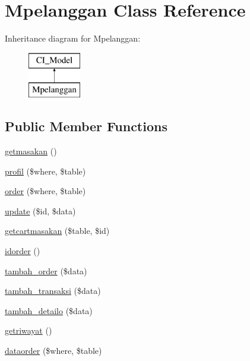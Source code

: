 \hypertarget{class_mpelanggan}{}\section{Mpelanggan Class Reference}
\label{class_mpelanggan}
Inheritance diagram for Mpelanggan\+:\begin{figure}[H]
\begin{center}
\leavevmode
\includegraphics[height=2.000000cm]{class_mpelanggan}
\end{center}
\end{figure}
\subsection*{Public Member Functions}
\begin{DoxyCompactItemize}
\item 
\mbox{\hyperlink{class_mpelanggan_af6cb3909c84d55dc39b68e22ad1c7ad3}{getmasakan}} ()
\item 
\mbox{\hyperlink{class_mpelanggan_a76e16cab9f6d103739adac11e86bce5f}{profil}} (\$where, \$table)
\item 
\mbox{\hyperlink{class_mpelanggan_a4fbd9d3452149bf51f6f9549a72baa3e}{order}} (\$where, \$table)
\item 
\mbox{\hyperlink{class_mpelanggan_acaa59d49766017d95ff8c84597aa88b8}{update}} (\$id, \$data)
\item 
\mbox{\hyperlink{class_mpelanggan_a2198aaef72ab6b5eb46c54b7a48569cf}{getcartmasakan}} (\$table, \$id)
\item 
\mbox{\hyperlink{class_mpelanggan_a609d55790b70e6c172ee10588e0c8453}{idorder}} ()
\item 
\mbox{\hyperlink{class_mpelanggan_a942758017dc79d0d59bf4ba7b09d0b53}{tambah\+\_\+order}} (\$data)
\item 
\mbox{\hyperlink{class_mpelanggan_a714bedce1322d287bcfb93295feddb9c}{tambah\+\_\+transaksi}} (\$data)
\item 
\mbox{\hyperlink{class_mpelanggan_a8cb5db96c9950be16b2f23d67501bf44}{tambah\+\_\+detailo}} (\$data)
\item 
\mbox{\hyperlink{class_mpelanggan_aff459bbf030d5ab3dc311ab077349371}{getriwayat}} ()
\item 
\mbox{\hyperlink{class_mpelanggan_a14a9728dea7c640c4a8c2b2b2e31b78b}{dataorder}} (\$where, \$table)
\end{DoxyCompactItemize}


